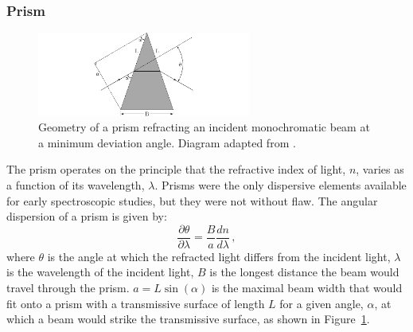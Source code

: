 \subsubsection{Prism} \label{subsubsec:prism}

\begin{figure}[t]
    \centering
    \includegraphics[width = 7cm]{figures/2_prism_diagram.pdf}
    \caption{Geometry of a prism refracting an incident monochromatic beam at a minimum deviation angle. Diagram adapted from \cite{BirneyObsAstro}.}
    \label{fig:prism_diagram}
\end{figure}

The prism operates on the principle that the refractive index of light, $n$, varies as a function of its wavelength, $\lambda$. Prisms were the only dispersive elements available for early spectroscopic studies, but they were not without flaw. The angular dispersion of a prism is given by:
\begin{equation}
    \frac{\partial \theta}{\partial \lambda} = \frac{B}{a}\frac{dn}{d\lambda}\,,\label{eq:prism_angular_dispersion}
\end{equation}
where $\theta$ is the angle at which the refracted light differs from the incident light, $\lambda$ is the wavelength of the incident light, $B$ is the longest distance the beam would travel through the prism. $a = L \sin(\alpha)$ is the maximal beam width that would fit onto a prism with a transmissive surface of length $L$ for a given angle, $\alpha$, at which a beam would strike the transmissive surface, as shown in Figure~\ref{fig:prism_diagram}.

